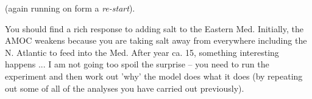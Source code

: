 (again running on form a \textit{re-start}).

\vspace{1mm}
You should find a rich response to adding salt to the Eastern Med. Initially, the AMOC weakens because you are taking salt away from everywhere including the N. Atlantic to feed into the Med. After year ca. 15, something interesting happens ... I am not going too spoil the surprise -- you need to run the experiment and then work out 'why' the model does what it does (by repeating out some of all of the analyses you have carried out previously).


